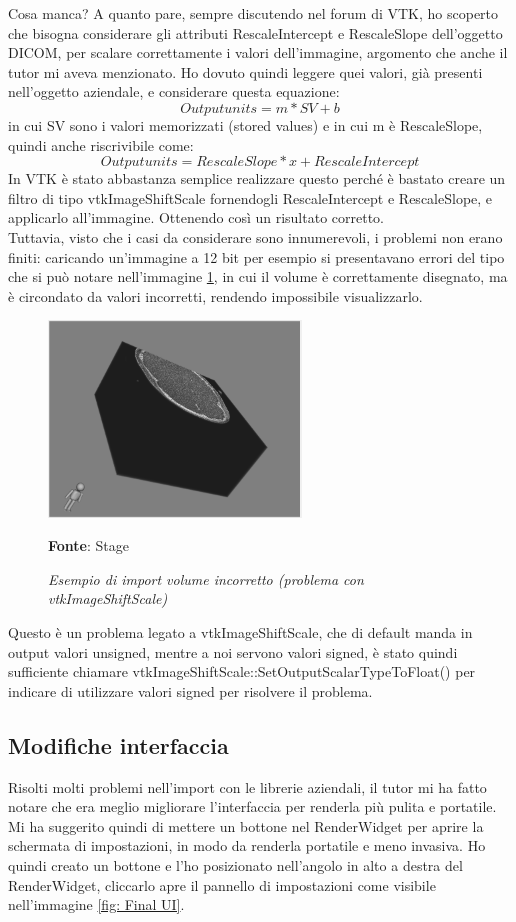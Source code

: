 Cosa manca? A quanto pare, sempre discutendo nel forum di VTK, ho scoperto che bisogna considerare gli attributi RescaleIntercept e RescaleSlope dell'oggetto DICOM, per scalare correttamente i valori dell'immagine, argomento che anche il tutor mi aveva menzionato. Ho dovuto quindi leggere quei valori, già presenti nell'oggetto aziendale, e considerare questa equazione:
\[ Output units = m *SV + b \]
in cui SV sono i valori memorizzati (stored values) e in cui m è RescaleSlope, quindi anche riscrivibile come: 
\[ Output units = RescaleSlope * x + RescaleIntercept \]
In VTK è stato abbastanza semplice realizzare questo perché è bastato creare un filtro di tipo vtkImageShiftScale fornendogli RescaleIntercept e RescaleSlope, e applicarlo all'immagine. Ottenendo così un risultato corretto.
\\
Tuttavia, visto che i casi da considerare sono innumerevoli, i problemi non erano finiti: caricando un'immagine a 12 bit per esempio si presentavano errori del tipo che si può notare nell'immagine \ref{fig: Volume Wrong Value}, in cui il volume è correttamente disegnato, ma è circondato da valori incorretti, rendendo impossibile visualizzarlo.

\begin{figure}[h]
    \centering
    \includegraphics[width=0.6\textwidth]{immagini/svolgimento/volumebroken12bit.png}
    \caption{\textit{Esempio di import volume incorretto (problema con vtkImageShiftScale)}}
    \textbf{Fonte}: Stage
    \label{fig: Volume Wrong Value}
\end{figure}

Questo è un problema legato a vtkImageShiftScale, che di default manda in output valori unsigned, mentre a noi servono valori signed, è stato quindi sufficiente chiamare vtkImageShiftScale::SetOutputScalarTypeToFloat() per indicare di utilizzare valori signed per risolvere il problema.

\subsection{Modifiche interfaccia}
Risolti molti problemi nell'import con le librerie aziendali, il tutor mi ha fatto notare che era meglio migliorare l'interfaccia per renderla più pulita e portatile. Mi ha suggerito quindi di mettere un bottone nel RenderWidget per aprire la schermata di impostazioni, in modo da renderla portatile e meno invasiva. Ho quindi creato un bottone e l'ho posizionato nell'angolo in alto a destra del RenderWidget, cliccarlo apre il pannello di impostazioni come visibile nell'immagine \ref{fig: Final UI}.

